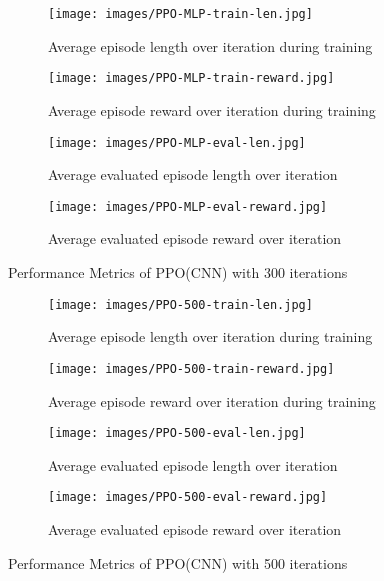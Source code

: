 \documentclass{article}
\begin{document}
\begin{figure}[h!]
    \centering
    \begin{subfigure}{0.8\textwidth}
        \centering
        \texttt{[image: images/PPO-MLP-train-len.jpg]}
        \caption{Average episode length over iteration during training}
        \label{fig:PPO-MLP-train-len}
    \end{subfigure}
    \begin{subfigure}{0.8\textwidth}
        \centering
        \texttt{[image: images/PPO-MLP-train-reward.jpg]}
        \caption{Average episode reward over iteration during training}
        \label{fig:PPO-MLP-train-reward}
    \end{subfigure}
    \begin{subfigure}{0.8\textwidth}
        \centering
        \texttt{[image: images/PPO-MLP-eval-len.jpg]}
        \caption{Average evaluated episode length over iteration}
        \label{fig:PPO-MLP-eval-len}
    \end{subfigure}
    \begin{subfigure}{0.8\textwidth}
        \centering
        \texttt{[image: images/PPO-MLP-eval-reward.jpg]}
        \caption{Average evaluated episode reward over iteration}
        \label{fig:PPO-MLP-eval-reward}
    \end{subfigure}
    \caption{Performance Metrics of PPO(CNN) with 300 iterations}
    \label{fig:PPO-MLP}
\end{figure}

\begin{figure}[h!]
    \centering
    \begin{subfigure}{0.9\textwidth}
        \centering
        \texttt{[image: images/PPO-500-train-len.jpg]}
        \caption{Average episode length over iteration during training}
        \label{fig:PPO-500-train-len}
    \end{subfigure}
    \begin{subfigure}{0.9\textwidth}
        \centering
        \texttt{[image: images/PPO-500-train-reward.jpg]}
        \caption{Average episode reward over iteration during training}
        \label{fig:PPO-500-train-reward}
    \end{subfigure}
    \begin{subfigure}{0.9\textwidth}
        \centering
        \texttt{[image: images/PPO-500-eval-len.jpg]}
        \caption{Average evaluated episode length over iteration}
        \label{fig:PPO-500-eval-len}
    \end{subfigure}
    \begin{subfigure}{0.9\textwidth}
        \centering
        \texttt{[image: images/PPO-500-eval-reward.jpg]}
        \caption{Average evaluated episode reward over iteration}
        \label{fig:PPO-500-eval-reward}
    \end{subfigure}
    \caption{Performance Metrics of PPO(CNN) with 500 iterations}
    \label{fig:PPO-500}
\end{figure}
\end{document}
